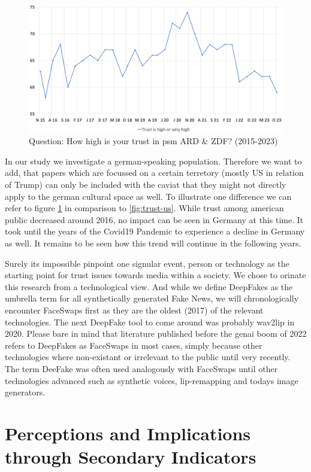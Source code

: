 \documentclass[
  a4paper,  %
  twoside,  %
  bibliography=totoc,
  headsepline,
  cleardoublepage=empty,
  parskip=half,
  draft=false
]{scrbook}
\begin{document}
\begin{figure}[h]
  \centering
  \includegraphics[width=0.9\linewidth]{./graphics/images/FGW-Trust-in-ARDZDF.png}
  \caption{Question: How high is your trust in \gls{psm} ARD \& ZDF? (2015-2023) \cite{zdf-politbarometerVertrauenGlaubwuerdigkeitBerichterstattung2023}}
  \label{fig:trust-ger}
\end{figure}
In our study we investigate a german-speaking population. Therefore we want to add, that papers which are focussed on a certain terretory (mostly US in relation of Trump) can only be included with the caviat that they might not directly apply to the german cultural space as well. To illustrate one difference we can refer to figure \ref{fig:trust-ger} in comparison to \ref{fig:trust-us}. While trust among american public decreased around 2016, no impact can be seen in Germany at this time. It took until the years of the Covid19 Pandemic to experience a decline in Germany as well. It remains to be seen how this trend will continue in the following years.

Surely its impossible pinpoint one signular event, person or technology as the starting point for trust issues towards media within a society. We chose to orinate this research from a technological view. And while we define DeepFakes as the umbrella term for all synthetically generated Fake News, we will chronologically encounter FaceSwaps first as they are the oldest (2017) of the relevant technologies. The next DeepFake tool to come around was probably wav2lip in 2020. Please bare in mind that literature published before the \gls{genai} boom of 2022 refers to DeepFakes as FaceSwaps in most cases, simply because other technologies where non-existant or irrelevant to the public until very recently. The term DeeFake was often used analogously with FaceSwaps until other technologies advanced such as synthetic voices, lip-remapping and todays image generators.

\section{Perceptions and Implications through Secondary Indicators} 
\label{sec:rel-secondary}
\end{document}
